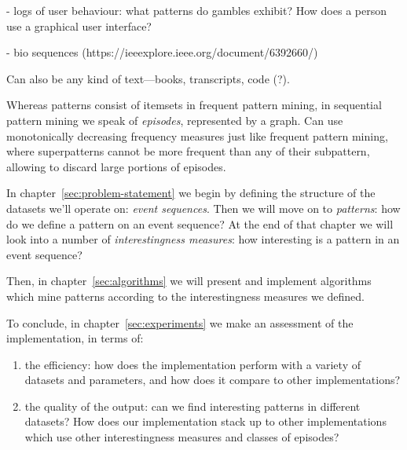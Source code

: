 - logs of user behaviour: what patterns do gambles exhibit? How does a person use a graphical user interface?

- bio sequences (https://ieeexplore.ieee.org/document/6392660/)

Can also be any kind of text---books, transcripts, code (?).

Whereas patterns consist of itemsets in frequent pattern mining, in sequential pattern mining we speak of \emph{episodes}, represented by a graph. Can use monotonically decreasing frequency measures just like frequent pattern mining, where superpatterns cannot be more frequent than any of their subpattern, allowing to discard large portions of episodes.

In chapter~\ref{sec:problem-statement} we begin by defining the structure of the datasets we'll operate on: \emph{event sequences}. Then we will move on to \emph{patterns}: how do we define a pattern on an event sequence? At the end of that chapter we will look into a number of \emph{interestingness measures}: how interesting is a pattern in an event sequence?

Then, in chapter~\ref{sec:algorithms} we will present and implement algorithms which mine patterns according to the interestingness measures we defined.

To conclude, in chapter~\ref{sec:experiments} we make an assessment of the implementation, in terms of:

\begin{enumerate}
\item the efficiency: how does the implementation perform with a variety of datasets and parameters, and how does it compare to other implementations?
\item the quality of the output: can we find interesting patterns in different datasets? How does our implementation stack up to other implementations which use other interestingness measures and classes of episodes?
\end{enumerate}
